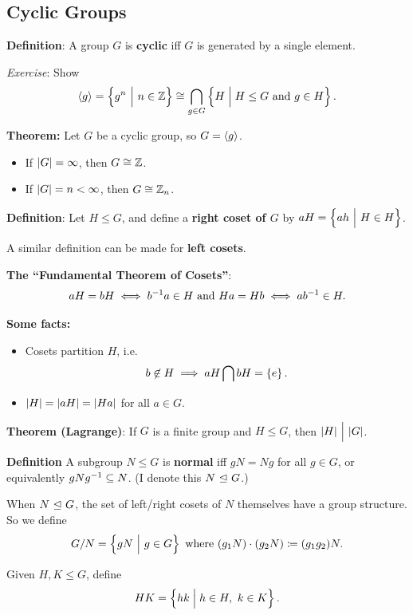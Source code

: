 \hypertarget{cyclic-groups}{%
\subsection{Cyclic Groups}\label{cyclic-groups}}

\textbf{Definition}: A group \(G\) is \textbf{cyclic} iff \(G\) is
generated by a single element.

\emph{Exercise}: Show \[
\left\langle{g}\right\rangle = \left\{{g^n {~\mathrel{\Big|}~} n\in{\mathbb{Z}}}\right\} \cong \bigcap_{g\in G} \left\{{H \mathrel{\Big|} H \leq G \text{ and } g\in H}\right\}
.\]

\textbf{Theorem:} Let \(G\) be a cyclic group, so
\(G = \left\langle{g}\right\rangle\).

\begin{itemize}
\item
  If \({\left\lvert {G} \right\rvert} = \infty\), then \(G \cong {\mathbb{Z}}\).
\item
  If \({\left\lvert {G} \right\rvert} = n < \infty\), then \(G \cong {\mathbb{Z}}_n\).
\end{itemize}

\textbf{Definition}: Let \(H \leq G\), and define a \textbf{right coset
of \(G\)} by \(aH = \left\{{ah {~\mathrel{\Big|}~} H \in H}\right\}\).

A similar definition can be made for \textbf{left cosets}.

\textbf{The ``Fundamental Theorem of Cosets''}: \[
aH = bH \iff b^{-1} a \in H \text{ and } Ha = Hb \iff ab^{-1} \in H
.\]

\textbf{Some facts:}

\begin{itemize}
\item
  Cosets partition \(H\), i.e. \[
  b\not\in H \implies aH \bigcap bH = \left\{{e}\right\}
  .\]
\item
  \({\left\lvert {H} \right\rvert} = {\left\lvert {aH} \right\rvert} = {\left\lvert {Ha} \right\rvert}\) for all \(a\in G\).
\end{itemize}

\textbf{Theorem (Lagrange)}: If \(G\) is a finite group and
\(H \leq G\), then \({\left\lvert {H} \right\rvert} {~\Bigm| ~} {\left\lvert {G} \right\rvert}\).

\textbf{Definition} A subgroup \(N \leq G\) is \textbf{normal} iff
\(gN = Ng\) for all \(g\in G\), or equivalently \(gNg^{-1} \subseteq N\).
(I denote this \(N {~\trianglelefteq~} G\).)

When \(N {~\trianglelefteq~} G\), the set of left/right cosets of \(N\) themselves
have a group structure. So we define \[
G/N = \left\{{gN {~\mathrel{\Big|}~} g\in G}\right\}
\text{ where }
(g_1 N)\cdot (g_2 N) \coloneqq (g_1 g_2) N
.\]

Given \(H, K \leq G\), define \[
HK = \left\{{hk \mathrel{\Big|} h\in H, ~k\in K}\right\}
.\]

